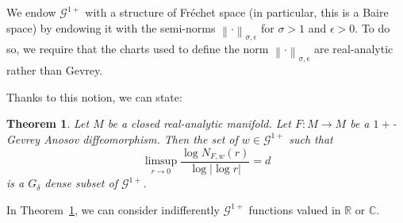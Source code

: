 \documentclass[10pt]{amsart}
\newtheorem{theo}{Theorem}[section]
\theoremstyle{definition}\newtheorem{defi}[theo]{Definition}\newtheorem{rema}[theo]{Remark}\newtheorem{exam}[theo]{Example}\newtheorem{exem}[theo]{Example}\newtheorem{nota}[theo]{Notation}
\newcommand{\n}[1]{\left\|#1\right\|}
\newcommand{\va}[1]{\left|#1\right|}
\newcommand{\clG}{\mathcal{G}}
\newcommand{\bbC}{\mathbb{C}}
\newcommand{\bbR}{\mathbb{R}}
\begin{document}
We endow $\clG^{1+}$ with a structure of Fréchet space (in particular, this is a Baire space) by endowing it with the semi-norms $\n{\cdot}_{\sigma,\epsilon}$ for $\sigma > 1$ and $\epsilon > 0$. To do so, we require that the charts used to define the norm $\n{\cdot}_{\sigma,\epsilon}$ are real-analytic rather than Gevrey.

Thanks to this notion, we can state:

\begin{theo}\label{theorem:optimal_strange}
Let $M$ be a closed real-analytic manifold. Let $F: M \to M$ be a $1+$-Gevrey Anosov diffeomorphism. Then the set of $w \in \clG^{1+}$ such that
\begin{equation}\label{eq:equality_optimal}
\limsup_{r \to 0} \frac{\log N_{F,w}(r)}{\log \va{\log r}} = d
\end{equation}
is a $G_\delta$ dense subset of $\clG^{1+}$.
\end{theo}

In Theorem~\ref{theorem:optimal_strange}, we can consider indifferently $\clG^{1+}$ functions valued in $\bbR$ or $\bbC$.
\end{document}

